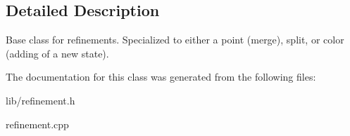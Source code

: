 \subsection{Detailed Description}
Base class for refinements. Specialized to either a point (merge), split, or color (adding of a new state). 

The documentation for this class was generated from the following files\+:\begin{DoxyCompactItemize}
\item 
lib/refinement.\+h\item 
refinement.\+cpp\end{DoxyCompactItemize}
